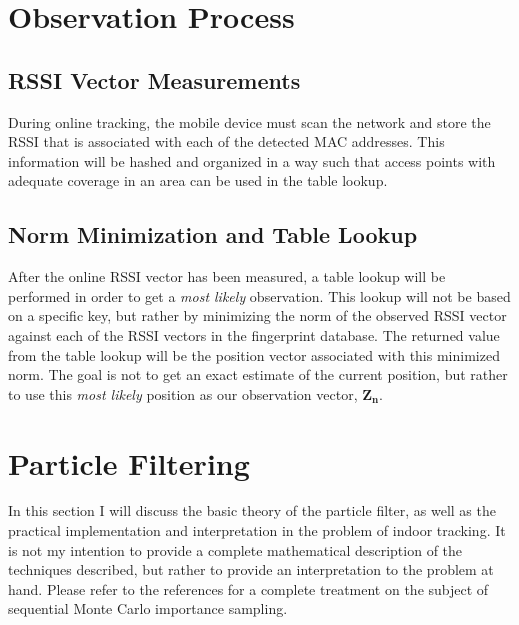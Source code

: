 \documentclass[12pt, a4paper]{article}
\begin{document}
	\section{Observation Process}
		\subsection{RSSI Vector Measurements}
			During online tracking, the mobile device must scan the network and store the RSSI that is associated with each of the detected MAC addresses. This information will be hashed and organized in a way such that access points with adequate coverage in an area can be used in the table lookup.
		\subsection{Norm Minimization and Table Lookup}
			After the online RSSI vector has been measured, a table lookup will be performed in order to get a \textit{most likely} observation. This lookup will not be based on a specific key, but rather by minimizing the norm of the observed RSSI vector against each of the RSSI vectors in the fingerprint database. The returned value from the table lookup will be the position vector associated with this minimized norm. The goal is not to get an exact estimate of the current position, but rather to use this \textit{most likely} position as our observation vector, $\mathbf{Z_n}$.

	\section{Particle Filtering}
		In this section I will discuss the basic theory of the particle filter, as well as the practical implementation and interpretation in the problem of indoor tracking. It is not my intention to provide a complete mathematical description of the techniques described, but rather to provide an interpretation to the problem at hand. Please refer to the references for a complete treatment on the subject of sequential Monte Carlo importance sampling.
\end{document}
